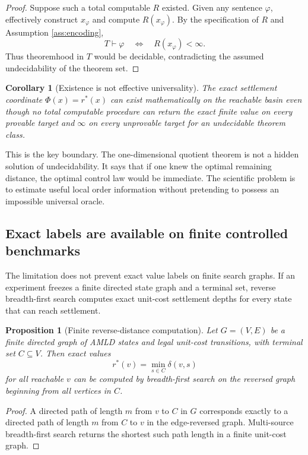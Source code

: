 \documentclass[11pt,letterpaper]{article}
\newtheorem{proposition}[theorem]{Proposition}
\newtheorem{corollary}[theorem]{Corollary}
\theoremstyle{remark}
\newcommand{\rstar}{r^{\!*}}
\begin{document}
\begin{proof}
Suppose such a total computable $R$ existed. Given any sentence $\varphi$, effectively construct $x_\varphi$ and compute $R(x_\varphi)$. By the specification of $R$ and Assumption \ref{ass:encoding},
\[
T\vdash\varphi\quad\Longleftrightarrow\quad R(x_\varphi)<\infty.
\]
Thus theoremhood in $T$ would be decidable, contradicting the assumed undecidability of the theorem set.
\end{proof}

\begin{corollary}[Existence is not effective universality]
The exact settlement coordinate $\Phi(x)=\rstar(x)$ can exist mathematically on the reachable basin even though no total computable procedure can return the exact finite value on every provable target and $\infty$ on every unprovable target for an undecidable theorem class.
\end{corollary}

This is the key boundary. The one-dimensional quotient theorem is not a hidden solution of undecidability. It says that if one knew the optimal remaining distance, the optimal control law would be immediate. The scientific problem is to estimate useful local order information without pretending to possess an impossible universal oracle.

\subsection{Exact labels are available on finite controlled benchmarks}

The limitation does not prevent exact value labels on finite search graphs. If an experiment freezes a finite directed state graph and a terminal set, reverse breadth-first search computes exact unit-cost settlement depths for every state that can reach settlement.

\begin{proposition}[Finite reverse-distance computation]\label{prop:reversebfs}
Let $G=(V,E)$ be a finite directed graph of AMLD states and legal unit-cost transitions, with terminal set $C\subseteq V$. Then exact values
\[
\rstar(v)=\min_{s\in C}\delta(v,s)
\]
for all reachable $v$ can be computed by breadth-first search on the reversed graph beginning from all vertices in $C$.
\end{proposition}

\begin{proof}
A directed path of length $m$ from $v$ to $C$ in $G$ corresponds exactly to a directed path of length $m$ from $C$ to $v$ in the edge-reversed graph. Multi-source breadth-first search returns the shortest such path length in a finite unit-cost graph.
\end{proof}
\end{document}
